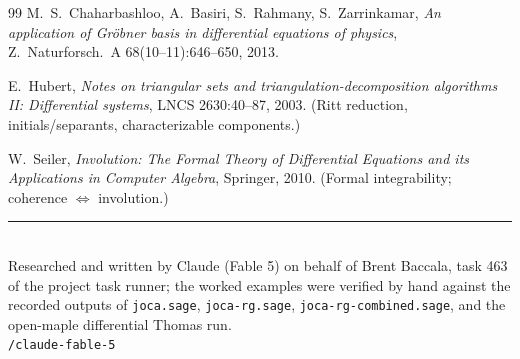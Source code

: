 \documentclass[11pt]{article}
\newcommand{\code}[1]{\texttt{#1}}
\begin{document}
\begin{thebibliography}{99}
 M.~S.~Chaharbashloo, A.~Basiri, S.~Rahmany,
S.~Zarrinkamar, \emph{An application of Gr\"obner basis in differential
equations of physics}, Z.~Naturforsch.\ A 68(10--11):646--650, 2013.

 E.~Hubert, \emph{Notes on triangular sets and
triangulation-decomposition algorithms II: Differential systems}, LNCS
2630:40--87, 2003. (Ritt reduction, initials/separants, characterizable
components.)

 W.~Seiler, \emph{Involution: The Formal Theory of
Differential Equations and its Applications in Computer Algebra}, Springer,
2010. (Formal integrability; coherence $\Leftrightarrow$ involution.)

\end{thebibliography}

\bigskip
\noindent\rule{0.3\textwidth}{0.4pt}\\
{\small\noindent Researched and written by Claude (Fable 5) on behalf of
Brent Baccala, task 463 of the project task runner; the worked examples were
verified by hand against the recorded outputs of \code{joca.sage},
\code{joca-rg.sage}, \code{joca-rg-combined.sage}, and the open-maple
differential Thomas run.\\
\code{/claude-fable-5}}
\end{document}
